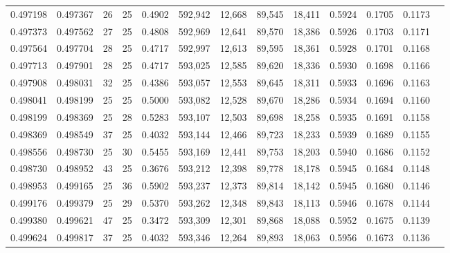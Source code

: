 \begin{tabular}{rrrrrrrrrrrrr}
0.497198 & 0.497367 &    26 &  25 &                                     0.4902 & 592,942 &  12,668 &  89,545 &  18,411 & 0.5924 & 0.1705 & 0.1173 \\
0.497373 & 0.497562 &    27 &  25 &                                     0.4808 & 592,969 &  12,641 &  89,570 &  18,386 & 0.5926 & 0.1703 & 0.1171 \\
0.497564 & 0.497704 &    28 &  25 &                                     0.4717 & 592,997 &  12,613 &  89,595 &  18,361 & 0.5928 & 0.1701 & 0.1168 \\
0.497713 & 0.497901 &    28 &  25 &                                     0.4717 & 593,025 &  12,585 &  89,620 &  18,336 & 0.5930 & 0.1698 & 0.1166 \\
0.497908 & 0.498031 &    32 &  25 &                                     0.4386 & 593,057 &  12,553 &  89,645 &  18,311 & 0.5933 & 0.1696 & 0.1163 \\
0.498041 & 0.498199 &    25 &  25 &                                     0.5000 & 593,082 &  12,528 &  89,670 &  18,286 & 0.5934 & 0.1694 & 0.1160 \\
0.498199 & 0.498369 &    25 &  28 &                                     0.5283 & 593,107 &  12,503 &  89,698 &  18,258 & 0.5935 & 0.1691 & 0.1158 \\
0.498369 & 0.498549 &    37 &  25 &                                     0.4032 & 593,144 &  12,466 &  89,723 &  18,233 & 0.5939 & 0.1689 & 0.1155 \\
0.498556 & 0.498730 &    25 &  30 &                                     0.5455 & 593,169 &  12,441 &  89,753 &  18,203 & 0.5940 & 0.1686 & 0.1152 \\
0.498730 & 0.498952 &    43 &  25 &                                     0.3676 & 593,212 &  12,398 &  89,778 &  18,178 & 0.5945 & 0.1684 & 0.1148 \\
0.498953 & 0.499165 &    25 &  36 &                                     0.5902 & 593,237 &  12,373 &  89,814 &  18,142 & 0.5945 & 0.1680 & 0.1146 \\
0.499176 & 0.499379 &    25 &  29 &                                     0.5370 & 593,262 &  12,348 &  89,843 &  18,113 & 0.5946 & 0.1678 & 0.1144 \\
0.499380 & 0.499621 &    47 &  25 &                                     0.3472 & 593,309 &  12,301 &  89,868 &  18,088 & 0.5952 & 0.1675 & 0.1139 \\
0.499624 & 0.499817 &    37 &  25 &                                     0.4032 & 593,346 &  12,264 &  89,893 &  18,063 & 0.5956 & 0.1673 & 0.1136 \\

\end{tabular}
